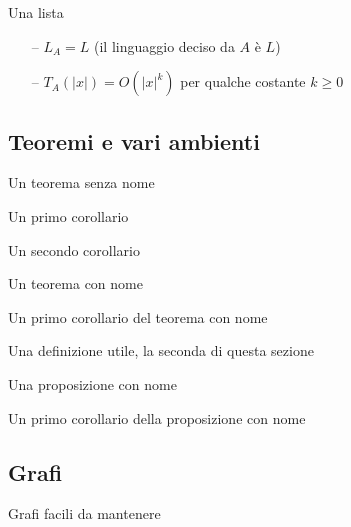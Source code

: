 Una lista
\begin{itemize}[noitemsep,parsep=0pt,partopsep=0pt,topsep=0pt]
    \item[--] $L_A = L$ (il linguaggio deciso da $A$ è $L$)
    \item[--] $T_A(|x|) = O(|x|^k)$ per qualche costante $k \geq 0$
\end{itemize}

\subsection{Teoremi e vari ambienti }

\begin{theorem}
    Un teorema senza nome
\end{theorem}

\begin{corollario}
    Un primo corollario
\end{corollario}

\begin{corollario}
    Un secondo corollario
\end{corollario}

\begin{theorem}
    Un teorema con nome
\end{theorem}

\begin{corollario}
    Un primo corollario del teorema con nome
\end{corollario}

\begin{definition}
    Una definizione utile, la seconda di questa sezione
\end{definition}

\begin{proposizione}
    Una proposizione con nome
\end{proposizione}

\begin{corollario}
    Un primo corollario della proposizione con nome
\end{corollario}

\subsection{Grafi}

Grafi facili da mantenere


